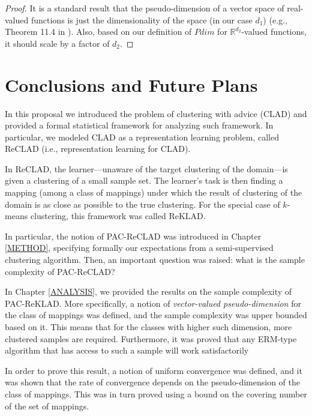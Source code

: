 \documentclass[letterpaper,12pt,titlepage,oneside,final]{book}
\begin{document}
\begin{proof}
It is a standard result that the pseudo-dimension of a vector space of real-valued functions is just the dimensionality of the space (in our case $d_1$) (e.g., Theorem 11.4 in \cite{anthony2009neural}). Also, based on our definition of $Pdim$ for $\mathbb{R}^{d_2}$-valued functions, it should scale by a factor of $d_2$.
\end{proof}




\chapter{Conclusions and Future Plans}
\label{CONCLUSION}

In this proposal we introduced the problem of clustering with advice (CLAD) and provided a formal statistical framework for analyzing such framework. In particular, we modeled CLAD as a representation learning problem, called ReCLAD (i.e., representation learning for CLAD).

In ReCLAD, the learner---unaware of the target clustering of the domain---is given a clustering of a small sample set. The learner's task is then finding a mapping (among a class of mappings) under which the result of clustering of the domain is as close as possible to the true clustering. For the special case of $k$-means clustering, this framework was called ReKLAD.

In particular, the notion of PAC-ReCLAD was introduced in Chapter \ref{METHOD}, specifying formally our expectations from a semi-supervised clustering algorithm. Then, an important question was raised: what is the sample complexity of PAC-ReCLAD?

In Chapter \ref{ANALYSIS}, we provided the results on the sample complexity of PAC-ReKLAD. More specifically, a notion of \textit{vector-valued pseudo-dimension} for the class of mappings was defined, and the sample complexity was upper bounded based on it. This means that for the classes with higher such dimension, more clustered samples are required. Furthermore, it was proved that any ERM-type algorithm that has access to such a sample will work satisfactorily

In order to prove this result, a notion of uniform convergence was defined, and it was shown that the rate of convergence depends on the pseudo-dimension of the class of mappings. This was in turn proved using a bound on the covering number of the set of mappings.
\end{document}
